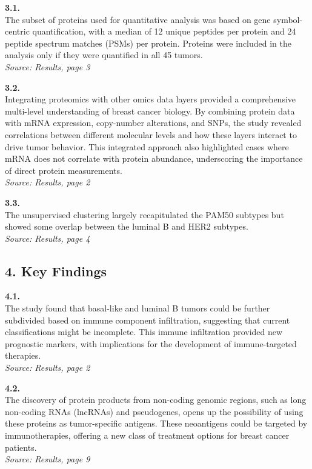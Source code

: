 \documentclass[
  letterpaper,
  DIV=11,
  numbers=noendperiod]{scrartcl}
\begin{document}
\textbf{3.1.}\\
The subset of proteins used for quantitative analysis was based on gene
symbol-centric quantification, with a median of 12 unique peptides per
protein and 24 peptide spectrum matches (PSMs) per protein. Proteins
were included in the analysis only if they were quantified in all 45
tumors.\\
\emph{Source: Results, page 3}

\textbf{3.2.}\\
Integrating proteomics with other omics data layers provided a
comprehensive multi-level understanding of breast cancer biology. By
combining protein data with mRNA expression, copy-number alterations,
and SNPs, the study revealed correlations between different molecular
levels and how these layers interact to drive tumor behavior. This
integrated approach also highlighted cases where mRNA does not correlate
with protein abundance, underscoring the importance of direct protein
measurements.\\
\emph{Source: Results, page 2}

\textbf{3.3.}\\
The unsupervised clustering largely recapitulated the PAM50 subtypes but
showed some overlap between the luminal B and HER2 subtypes.\\
\emph{Source: Results, page 4}

\subsection{4. Key Findings}\label{key-findings-1}

\textbf{4.1.}\\
The study found that basal-like and luminal B tumors could be further
subdivided based on immune component infiltration, suggesting that
current classifications might be incomplete. This immune infiltration
provided new prognostic markers, with implications for the development
of immune-targeted therapies.\\
\emph{Source: Results, page 2}

\textbf{4.2.}\\
The discovery of protein products from non-coding genomic regions, such
as long non-coding RNAs (lncRNAs) and pseudogenes, opens up the
possibility of using these proteins as tumor-specific antigens. These
neoantigens could be targeted by immunotherapies, offering a new class
of treatment options for breast cancer patients.\\
\emph{Source: Results, page 9}
\end{document}
